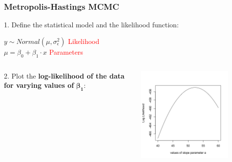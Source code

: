 \documentclass{beamer}
\begin{document}
\begin{frame}
    \frametitle{Metropolis-Hastings MCMC}
    \large
    1. Define the statistical model and the likelihood function:\vspace{0.3cm}
    
    $y \sim Normal(\mu, \sigma_\epsilon^2)$  \textcolor{red}{Likelihood} \\
    $\mu = \beta_0 + \beta_1 \cdot x$  \textcolor{red}{Parameters}

    \begin{columns}
        \begin{column}{0.4\textwidth}
            2. Plot the \textbf{log-likelihood of the data for varying values of} $\mathbf{\beta_1}$:
        \end{column}
        \begin{column}{0.6\textwidth}
            \includegraphics[width=0.8\textwidth]{lectures/day_11_bayesian_lm/figures/unnamed-chunk-9-1.png}
        \end{column}
    \end{columns}
\end{frame}
\end{document}
